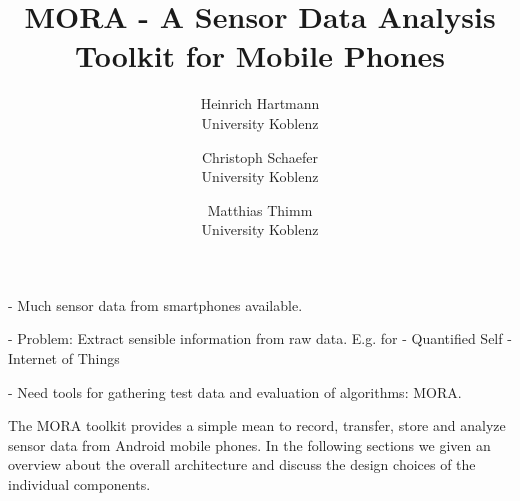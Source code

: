 \documentclass[times, 10pt,twocolumn]{article}
\begin{document}
\title{MORA - A Sensor Data Analysis Toolkit for Mobile Phones}

\author{Heinrich Hartmann\\
University Koblenz\\ %
\and
Christoph Schaefer \\
University Koblenz \\
\and
Matthias Thimm \\
University Koblenz \\
}

\maketitle
\thispagestyle{empty}

\begin{abstract}
\end{abstract}

- Much sensor data from smartphones available.

- Problem: Extract sensible information from raw data. E.g. for
  - Quantified Self
  - Internet of Things

- Need tools for gathering test data and evaluation of algorithms: MORA.


The MORA toolkit provides a simple mean to record, transfer, store and
analyze sensor data from Android mobile phones. In the following
sections we given an overview about the overall architecture and
discuss the design choices of the individual components.

\end{document}

